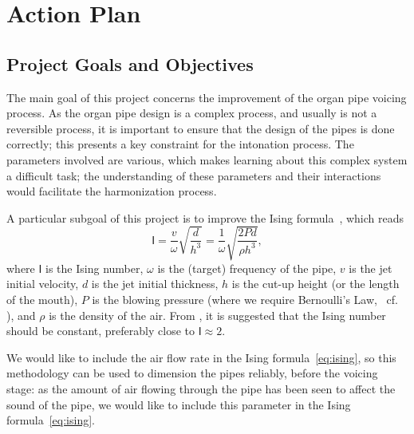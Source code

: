 \documentclass{psu-plan}
\begin{document}
\section{Action Plan}


\subsection{Project Goals and Objectives}

The main goal of this project concerns the improvement of the organ pipe voicing
process.
As the organ pipe design is a complex process, and usually is not a reversible
process, it is important to ensure that the design of the pipes is done
correctly; this presents a key constraint for the intonation process.
The parameters involved are various, which makes learning about this complex
system a difficult task; the understanding of these parameters and their
interactions would facilitate the harmonization process.

A particular subgoal of this project is to improve the Ising
formula~\autocite{1971Ising-1}, which reads
\begin{equation}
    \label{eq:ising}
    \mathsf{I}
    =
    \frac{v}{\omega}\sqrt{\frac{d}{h^3}}
    =
    \frac{1}{\omega}\sqrt{\frac{2 P d}{\rho h^3}},
\end{equation}
where \(\mathsf{I}\) is the Ising number, \(\omega\) is the (target) frequency
of the pipe, \(v\) is the jet initial velocity, \(d\) is the jet initial
thickness, \(h\) is the cut-up height (or the length of the mouth), \(P\) is the
blowing pressure (where we require Bernoulli's Law, ~cf. \autocite{2025Lilj-1}),
and \(\rho\) is the density of the air.
From \autocite{1971Ising-1, 2025Lilj-1}, it is suggested that the Ising number
should be constant, preferably close to \( \mathsf{I} \approx 2\).

We would like to include the air flow rate in the Ising formula~\ref{eq:ising},
so this methodology can be used to dimension the pipes reliably,
before the voicing stage: as the amount of air flowing through the pipe has been
seen to affect the sound of the pipe, we would like to include this parameter in
the Ising formula~\ref{eq:ising}.
\end{document}
